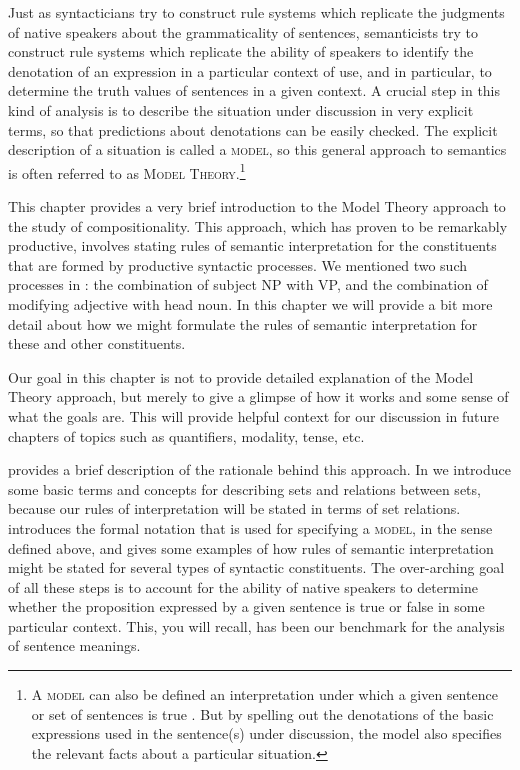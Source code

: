 Just as syntacticians try to construct rule systems which replicate the judgments of native speakers about the grammaticality of sentences, semanticists try to construct rule systems which replicate the ability of speakers to identify the denotation of an expression in a particular context of use, and in particular, to determine the truth values of sentences in a given context. A crucial step in this kind of analysis is to describe the situation under discussion in very explicit terms, so that predictions about denotations can be easily checked. The explicit description of a situation is called a \textsc{model}, so this general approach to semantics is often referred to as \textsc{Model Theory}.\footnote{A \textsc{model} can also be defined an interpretation under which a given sentence or set of sentences is true \citep{Hodge2013}. But by spelling out the denotations of the basic expressions used in the sentence(s) under discussion, the model also specifies the relevant facts about a particular situation.}



This chapter provides a very brief introduction to the Model Theory approach to the study of compositionality. This approach, which has proven to be remarkably productive, involves stating rules of semantic interpretation for the constituents that are formed by productive syntactic processes. We mentioned two such processes in : the combination of subject NP with VP, and the combination of modifying adjective with head noun. In this chapter we will provide a bit more detail about how we might formulate the rules of semantic interpretation for these and other constituents.



Our goal in this chapter is not to provide detailed explanation of the Model Theory approach, but merely to give a glimpse of how it works and some sense of what the goals are. This will provide helpful context for our discussion in future chapters of topics such as quantifiers, modality, tense, etc.



 provides a brief description of the rationale behind this approach. In  we introduce some basic terms and concepts for describing sets and relations between sets, because our rules of interpretation will be stated in terms of set relations.  introduces the formal notation that is used for specifying a \textsc{model}, in the sense defined above, and  gives some examples of how rules of semantic interpretation might be stated for several types of syntactic constituents. The over-arching goal of all these steps is to account for the ability of native speakers to determine whether the proposition expressed by a given sentence is true or false in some particular context. This, you will recall, has been our benchmark for the analysis of sentence meanings.


